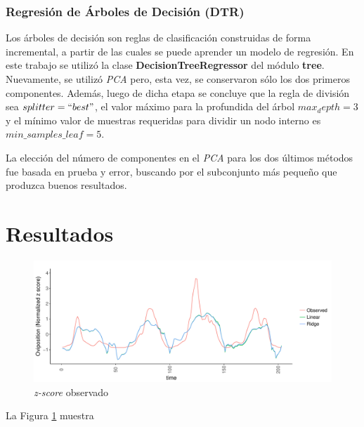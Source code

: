     \subsubsection{Regresión de Árboles de Decisión (DTR)}
      \par Los árboles de decisión son reglas de clasificación construidas de
      forma incremental, a partir de las cuales se puede aprender un modelo
      de regresión. En este trabajo se utilizó la clase \textbf{DecisionTreeRegressor}
      del módulo \textbf{tree}. Nuevamente, se utilizó \textit{PCA} pero, esta
      vez, se conservaron sólo los dos primeros componentes. Además, luego de
      dicha etapa se concluye que la regla de división sea $splitter = ``best"$,
      el valor máximo para la profundida del árbol $max_depth = 3$ y el mínimo
      valor de muestras requeridas para dividir un nodo interno es
      $min\_samples\_leaf = 5$.

      \par La elección del número de componentes en el \textit{PCA} para los
      dos últimos métodos fue basada en prueba y error, buscando por el
      subconjunto más pequeño que produzca buenos resultados.


  \section{Resultados}
    \begin{figure}
    \centering%
    \includegraphics[width=1\textwidth]{images/RidgeVsTime}%
    \caption{\textit{z-score} observado }\label{fig:ridge_vs_time}
    \end{figure}

    \par La Figura \ref{fig:ridge_vs_time} muestra

